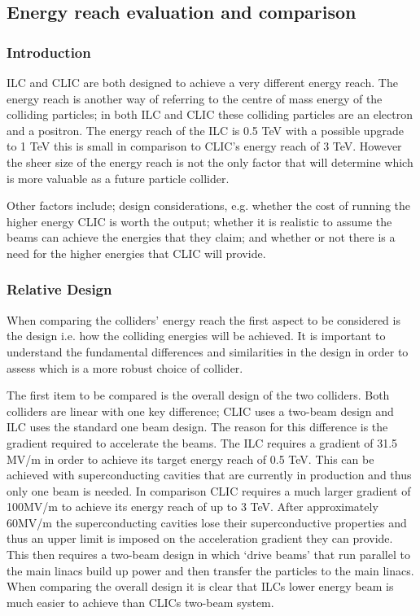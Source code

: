 \subsection{Energy reach evaluation and comparison}

\subsubsection{Introduction}
ILC and CLIC are both designed to achieve a very different energy reach. The energy reach is another way of referring to the centre of mass energy of the colliding particles; in both ILC and CLIC these colliding particles are an electron and a positron.  The energy reach of the ILC is 0.5 TeV with a possible upgrade to 1 TeV this is small in comparison to CLIC's energy reach of 3 TeV. However the sheer size of the energy reach is not the only factor that will determine which is more valuable as a future particle collider.

Other factors include; design considerations, e.g. whether the cost of running the higher energy CLIC is worth the output; whether it is realistic to assume the beams can achieve the energies that they claim; and whether or not there is a need for the higher energies that CLIC will provide.

\subsubsection{Relative Design}
When comparing the colliders' energy reach the first aspect to be considered is the design i.e. how the colliding energies will be achieved. It is important to understand the fundamental differences and similarities in the design in order to assess which is a more robust choice of collider.

The first item to be compared is the overall design of the two colliders. Both colliders are linear with one key difference; CLIC uses a two-beam design and ILC uses the standard one beam design. The reason for this difference is the gradient required to accelerate the beams. The ILC requires a gradient of 31.5 MV/m\cite{ILC:ReferenceDesignReport} in order to achieve its target energy reach of 0.5 TeV. This can be achieved with superconducting cavities that are currently in production and thus only one beam is needed. In comparison CLIC requires a much larger gradient of 100MV/m to achieve its energy reach of up to 3 TeV\cite{CLIC:ParameterList}. After approximately 60MV/m the superconducting cavities lose their superconductive properties and thus an upper limit is imposed on the acceleration gradient they can provide. This then requires a two-beam design in which `drive beams' that run parallel to the main linacs build up power and then transfer the particles to the main linacs. When comparing the overall design it is clear that ILCs lower energy beam is much easier to achieve than CLICs two-beam system.

